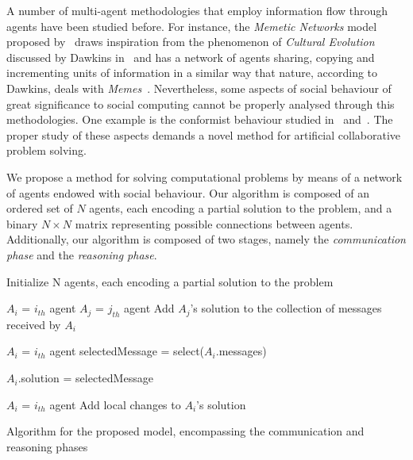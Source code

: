 \documentclass{article}
\begin{document}
A number of multi-agent methodologies that employ information flow through agents have been studied before. For instance, the {\em Memetic Networks} model proposed by~\cite{araujo:memenet} draws inspiration from the phenomenon of {\em Cultural Evolution} discussed by Dawkins in~\cite{dawkins:selfishgene} and has a network of agents sharing, copying and incrementing units of information in a similar way that nature, according to Dawkins, deals with {\em Memes}~\cite{dawkins:selfishgene}. Nevertheless, some aspects of social behaviour of great significance to social computing cannot be properly analysed through this methodologies. One example is the conformist behaviour studied in~\cite{cefferson:conformists} and~\cite{farenzena:collabem}. The proper study of these aspects demands a novel method for artificial collaborative problem solving.

We propose a method for solving computational problems by means of a network of agents endowed with social behaviour. Our algorithm is composed of an ordered set of $N$ agents, each encoding a partial solution to the problem, and a binary $N \times N$ matrix representing possible connections between agents. Additionally, our algorithm is composed of two stages, namely the {\em communication phase} and the {\em reasoning phase}. %

\begin{algorithm}
 \SetAlgoLined
 Initialize N agents, each encoding a partial solution to the problem\;
 {
 	{
 		{
 			{
 				$A_{i}$ = $i_{th}$ agent\;
 				$A_{j}$ = $j_{th}$ agent\;
 				Add $A_{j}$'s solution to the collection of messages received by $A_{i}$\; %
 			}
 		}
 	}
 	{
 		\;
 		$A_{i}$ = $i_{th}$ agent\;
 		selectedMessage = select($A_{i}$.messages)\;
 		
 		{
 			$A_{i}$.solution = selectedMessage\;
 		}
 	}
 	{
 		\;
 		$A_{i}$ = $i_{th}$ agent\;
 		Add local changes to $A_{i}$'s solution%
 	}
 }
 \caption{Algorithm for the proposed model, encompassing the communication and reasoning phases}
\end{algorithm}
\end{document}

